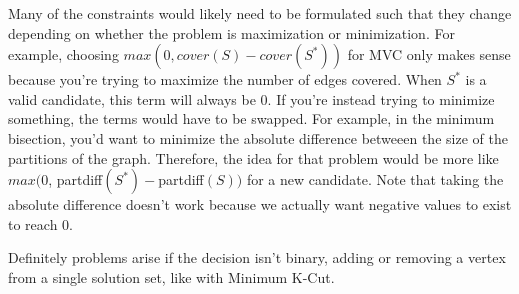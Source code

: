 \documentclass{article}
\begin{document}
Many of the constraints would likely need to be formulated such that they change depending on whether the problem is maximization or minimization. For example, choosing $max(0, cover(S) - cover(S^*))$ for MVC only makes sense because you're trying to maximize the number of edges covered. When $S^*$ is a valid candidate, this term will always be 0. If you're instead trying to minimize something, the terms would have to be swapped. For example, in the minimum bisection, you'd want to minimize the absolute difference betweeen the size of the partitions of the graph. Therefore, the idea for that problem would be more like $max(0$, partdiff$(S^*) - $partdiff$(S))$ for a new candidate. Note that taking the absolute difference doesn't work because we actually want negative values to exist to reach 0.

Definitely problems arise if the decision isn't binary, adding or removing a vertex from a single solution set, like with Minimum K-Cut.



\end{document}
